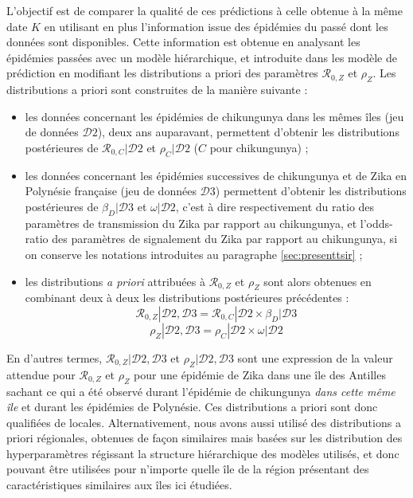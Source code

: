 L'objectif est de comparer la qualité de ces prédictions à celle obtenue à la même date $K$ en utilisant en plus l'information issue des épidémies du passé dont les données sont disponibles.
Cette information est obtenue en analysant les épidémies passées avec un modèle hiérarchique, et introduite dans les modèle de prédiction en modifiant les distributions a priori des paramètres $\mathcal{R}_{0,Z}$ et $\rho_Z$.
Les distributions a priori sont construites de la manière suivante :
\begin{itemize}
\item les données concernant les épidémies de chikungunya dans les mêmes îles (jeu de données $\mathcal{D}2$), deux ans auparavant, permettent d'obtenir les distributions postérieures de $\mathcal{R}_{0,C}|\mathcal{D}2$ et $\rho_C|\mathcal{D}2$ ($C$ pour chikungunya) ;
\item les données concernant les épidémies successives de chikungunya et de Zika en Polynésie française (jeu de données $\mathcal{D}3$) permettent d'obtenir les distributions postérieures de $\beta_D|\mathcal{D}3$ et $\omega|\mathcal{D}2$, c'est à dire respectivement du ratio des paramètres de transmission du Zika par rapport au chikungunya, et l'odds-ratio des paramètres de signalement du Zika par rapport au chikungunya, si on conserve les notations introduites au paragraphe \ref{sec:presenttsir} ;
\item les distributions {\em a priori} attribuées à  $\mathcal{R}_{0,Z}$ et $\rho_Z$ sont alors obtenues en combinant deux à deux les distributions postérieures précédentes :
\begin{equation}
\mathcal{R}_{0,Z}|\mathcal{D}2,\mathcal{D}3 = \mathcal{R}_{0,C}|\mathcal{D}2 \times \beta_D|\mathcal{D}3
\end{equation}
\begin{equation}
\rho_Z|\mathcal{D}2,\mathcal{D}3 = \rho_C|\mathcal{D}2 \times \omega|\mathcal{D}2
\end{equation}
\end{itemize}

En d'autres termes, $\mathcal{R}_{0,Z}|\mathcal{D}2,\mathcal{D}3$ et $\rho_Z|\mathcal{D}2,\mathcal{D}3$ sont une expression de la valeur attendue pour $\mathcal{R}_{0,Z}$ et $\rho_Z$ pour une épidémie de Zika dans une île des Antilles sachant ce qui a été observé durant l'épidémie de chikungunya {\em dans cette même île} et durant les épidémies de Polynésie.
Ces distributions a priori sont donc qualifiées de \guillemotleft locales\guillemotright.
Alternativement, nous avons aussi utilisé des distributions a priori \guillemotleft régionales\guillemotright, obtenues de façon similaires mais basées sur les distribution des hyperparamètres régissant la structure hiérarchique des modèles utilisés, et donc pouvant être utilisées pour n'importe quelle île de la région présentant des caractéristiques similaires aux îles ici étudiées.



